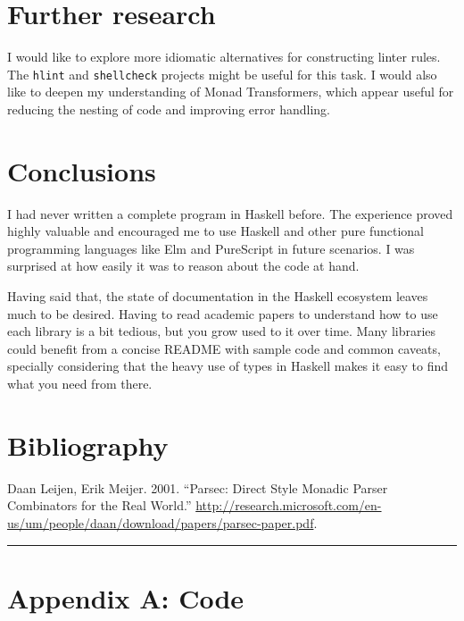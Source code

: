 \documentclass[]{article}
\begin{document}
\section{Further research}\label{further-research}

I would like to explore more idiomatic alternatives for constructing
linter rules. The \texttt{hlint} and \texttt{shellcheck} projects might
be useful for this task. I would also like to deepen my understanding of
Monad Transformers, which appear useful for reducing the nesting of code
and improving error handling.

\section{Conclusions}\label{conclusions}

I had never written a complete program in Haskell before. The experience
proved highly valuable and encouraged me to use Haskell and other pure
functional programming languages like Elm and PureScript in future
scenarios. I was surprised at how easily it was to reason about the code
at hand.

Having said that, the state of documentation in the Haskell ecosystem
leaves much to be desired. Having to read academic papers to understand
how to use each library is a bit tedious, but you grow used to it over
time. Many libraries could benefit from a concise README with sample
code and common caveats, specially considering that the heavy use of
types in Haskell makes it easy to find what you need from there.

\section{Bibliography}\label{bibliography}

Daan Leijen, Erik Meijer. 2001. “Parsec: Direct Style Monadic Parser Combinators
for the Real World.” \url{http://research.microsoft.com/en-us/um/people/daan/download/papers/parsec-paper.pdf}.

\begin{center}\rule{0.5\linewidth}{\linethickness}\end{center}

\clearpage

\section{Appendix A: Code}\label{appendix-a-code}











\end{document}
